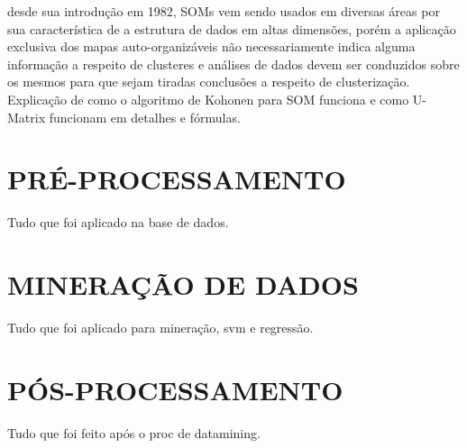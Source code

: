 \cite{ultsch1990kohonen} desde sua introdução em 1982, SOMs vem sendo usados em diversas áreas por sua característica de a estrutura de dados em altas dimensões, porém a aplicação exclusiva dos mapas auto-organizáveis não necessariamente indica alguma informação a respeito de clusteres e análises de dados devem ser conduzidos sobre os mesmos para que sejam tiradas conclusões a respeito de clusterização. Explicação de como o algoritmo de Kohonen para SOM funciona e como U-Matrix funcionam em detalhes e fórmulas. 

\section{PRÉ-PROCESSAMENTO}
\label{sec:metodologiaPreProc}
Tudo que foi aplicado na base de dados.

\section{MINERAÇÃO DE DADOS}
\label{sec:metodologiaMine}
Tudo que foi aplicado para mineração, svm e regressão.

\section{PÓS-PROCESSAMENTO}
\label{sec:metodologiaPosProc}
Tudo que foi feito após o proc de datamining.